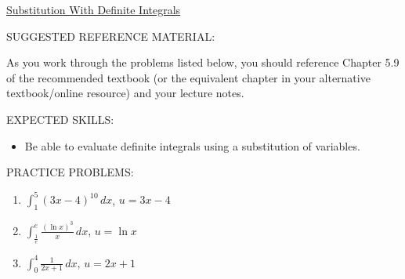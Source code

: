 \documentclass[12pt]{article}
\newif\ifans
\begin{document}
\begin{center}
\underline{\LARGE{Substitution With Definite Integrals}}
\end{center}

\noindent SUGGESTED REFERENCE MATERIAL:

\bigskip

\noindent As you work through the problems listed below, you should reference Chapter 5.9 of the recommended textbook (or the equivalent chapter in your alternative textbook/online resource) and your lecture notes.

\bigskip


\noindent EXPECTED SKILLS:

\begin{itemize}

\item Be able to evaluate definite integrals using a substitution of variables.

\end{itemize}

\noindent PRACTICE PROBLEMS:

\medskip


\begin{enumerate}

\item $\int_1^5 (3x-4)^{10} \,dx$, $u=3x-4$

\ifans{\fbox{$\frac{1}{3}\int_{-1}^{11} u^{10} \,du$}} \fi

\item $\int_{\frac{1}{e}}^{e} \frac{(\ln{x})^3}{x} \,dx$, $u=\ln{x}$

\ifans{\fbox{$\int_{-1}^1 u^3 \,du$; Detailed Solution: \textcolor{blue}{\href{http://www.math.drexel.edu/classes/Calculus/resources/Math122HW/Solutions/122_06_Substitution_Definite_02.pdf}{Here}}}} \fi

\item $\int_0^4 \frac{1}{2x+1} \,dx$, $u=2x+1$

\ifans{\fbox{$\frac{1}{2} \int_1^9 \frac{1}{u} \,du$}} \fi

\end{enumerate}

\end{document}
